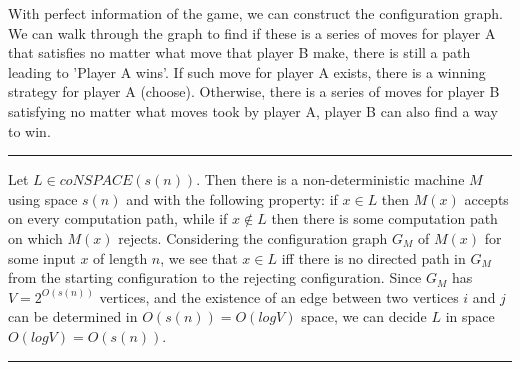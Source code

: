 \documentclass[twoside]{article}
\newenvironment{problem}[2][Problem]{\begin{trivlist}
		\item[\hskip \labelsep {\bfseries #1}\hskip \labelsep {\bfseries #2.}]}{\end{trivlist}}
\newenvironment{solution}{{\bf Solution:}}{\hfill\rule{2mm}{2mm}}
\begin{document}
\begin{problem}{4.10}
\end{problem}

\begin{solution}
With perfect information of the game, we can construct the configuration graph. 
We can walk through the graph to find if these is a series of moves for player A that satisfies no matter what move that player B make, there is still a path leading to 'Player A wins'.
If such move for  player A exists, there is a winning strategy for player A (choose).
Otherwise, there is a series of moves for player B satisfying no matter what moves took by player A, player B can also find a way to win.
\end{solution}

\begin{problem}{4.11}
\end{problem}
\begin{solution}
 Let $L\in coNSPACE(s(n))$. Then there is a non-deterministic machine $M$ using space $s(n)$ and with the following property: if $x\in L$ then $M(x)$ accepts on every computation path, while if $x \notin L$ then there is some computation path on which $M(x)$ rejects. Considering the configuration graph $G_M$ of $M(x)$ for some input $x$ of length $n$, we see that $x \in L$ iff there is no directed path in $G_M$ from the starting configuration to the rejecting configuration. Since $G_M$ has $V = 2^{O(s(n))}$ vertices, and the existence of an edge between two vertices $i$ and $j$ can be determined in $O(s(n)) = O(log V )$ space, we can decide $L$ in space $O(log V ) = O(s(n))$.
\end{solution}
\end{document}
